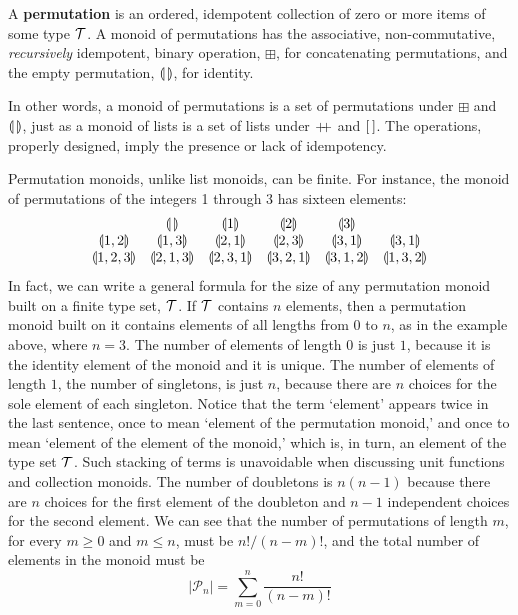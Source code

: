 \begin{definition}
  A \textbf{permutation} is an ordered, idempotent collection of zero or more items of some type $\mathcal{T}$. A monoid of permutations has the associative, non-commutative, \emph{recursively} idempotent, binary operation, $\boxplus$, for concatenating permutations, and the empty permutation, $\llparenthesis\,\rrparenthesis$, for identity.
\end{definition}


In other words, a monoid of permutations is a set of permutations under $\boxplus$ and $\llparenthesis\,\rrparenthesis$, just as a monoid of lists is a set of lists under $\pp$ and $[\,]$. The operations, properly designed, imply the presence or lack of idempotency.


Permutation monoids, unlike list monoids, can be finite. For instance, the monoid of permutations of the integers 1 through 3 has sixteen elements:
\[\begin{array}{cccccc}
  {} & \llparenthesis\,\rrparenthesis & \llparenthesis 1 \rrparenthesis & \llparenthesis 2 \rrparenthesis & \llparenthesis 3 \rrparenthesis & {} \\
  \llparenthesis 1,2 \rrparenthesis & \llparenthesis 1,3 \rrparenthesis & \llparenthesis 2,1 \rrparenthesis & \llparenthesis 2,3 \rrparenthesis & \llparenthesis 3,1 \rrparenthesis & \llparenthesis 3,1 \rrparenthesis \\
  \llparenthesis 1,2,3 \rrparenthesis & \llparenthesis 2,1,3 \rrparenthesis & \llparenthesis 2,3,1 \rrparenthesis
  & \llparenthesis 3,2,1 \rrparenthesis & \llparenthesis 3,1,2 \rrparenthesis & \llparenthesis 1,3,2 \rrparenthesis\\
\end{array}\]
In fact, we can write a general formula for the size of any permutation monoid built on a finite type set, $\mathcal{T}$. If $\mathcal{T}$ contains $n$ elements, then a permutation monoid built on it contains elements of all lengths from $0$ to $n$, as in the example above, where $n=3$. The number of elements of length $0$ is just $1$, because it is the identity element of the monoid and it is unique. The number of elements of length $1$, the number of singletons, is just $n$, because there are $n$ choices for the sole element of each singleton. Notice that the term `element' appears twice in the last sentence, once to mean `element of the permutation monoid,' and once to mean `element of the element of the monoid,' which is, in turn, an element of the type set $\mathcal{T}$. Such stacking of terms is unavoidable when discussing unit functions and collection monoids. The number of doubletons is $n(n-1)$ because there are $n$ choices for the first element of the doubleton and $n-1$ independent choices for the second element. We can see that the number of permutations of length $m$, for every $m\geq 0$ and $m\leq n$, must be $n!/(n-m)!$, and the total number of elements in the monoid must be
\begin{equation}
  |\mathcal{P}_{n}|=\sum_{m=0}^{n}\frac{n!}{(n-m)!}
  \label{eqn:howmanypermutations}
\end{equation}

